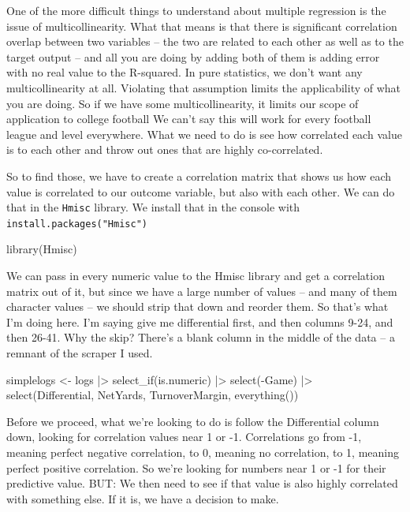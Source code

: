 \documentclass[
  letterpaper,
  DIV=11,
  numbers=noendperiod]{scrreprt}
\newenvironment{Shaded}{\begin{snugshade}}{\end{snugshade}}
\newcommand{\FunctionTok}[1]{\textcolor[rgb]{0.28,0.35,0.67}{#1}}
\newcommand{\NormalTok}[1]{\textcolor[rgb]{0.00,0.23,0.31}{#1}}
\newcommand{\OtherTok}[1]{\textcolor[rgb]{0.00,0.23,0.31}{#1}}
\newcommand{\SpecialCharTok}[1]{\textcolor[rgb]{0.37,0.37,0.37}{#1}}
\begin{document}
One of the more difficult things to understand about multiple regression
is the issue of multicollinearity. What that means is that there is
significant correlation overlap between two variables -- the two are
related to each other as well as to the target output -- and all you are
doing by adding both of them is adding error with no real value to the
R-squared. In pure statistics, we don't want any multicollinearity at
all. Violating that assumption limits the applicability of what you are
doing. So if we have some multicollinearity, it limits our scope of
application to college football We can't say this will work for every
football league and level everywhere. What we need to do is see how
correlated each value is to each other and throw out ones that are
highly co-correlated.

So to find those, we have to create a correlation matrix that shows us
how each value is correlated to our outcome variable, but also with each
other. We can do that in the \texttt{Hmisc} library. We install that in
the console with \texttt{install.packages("Hmisc")}

\begin{Shaded}
\begin{Highlighting}[]
\FunctionTok{library}\NormalTok{(Hmisc)}
\end{Highlighting}
\end{Shaded}

We can pass in every numeric value to the Hmisc library and get a
correlation matrix out of it, but since we have a large number of values
-- and many of them character values -- we should strip that down and
reorder them. So that's what I'm doing here. I'm saying give me
differential first, and then columns 9-24, and then 26-41. Why the skip?
There's a blank column in the middle of the data -- a remnant of the
scraper I used.

\begin{Shaded}
\begin{Highlighting}[]
\NormalTok{simplelogs }\OtherTok{\textless{}{-}}\NormalTok{ logs }\SpecialCharTok{|\textgreater{}} \FunctionTok{select\_if}\NormalTok{(is.numeric) }\SpecialCharTok{|\textgreater{}} \FunctionTok{select}\NormalTok{(}\SpecialCharTok{{-}}\NormalTok{Game) }\SpecialCharTok{|\textgreater{}} \FunctionTok{select}\NormalTok{(Differential, NetYards, TurnoverMargin, }\FunctionTok{everything}\NormalTok{())}
\end{Highlighting}
\end{Shaded}

Before we proceed, what we're looking to do is follow the Differential
column down, looking for correlation values near 1 or -1. Correlations
go from -1, meaning perfect negative correlation, to 0, meaning no
correlation, to 1, meaning perfect positive correlation. So we're
looking for numbers near 1 or -1 for their predictive value. BUT: We
then need to see if that value is also highly correlated with something
else. If it is, we have a decision to make.
\end{document}
